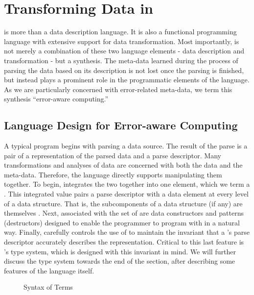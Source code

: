 \section{Transforming Data in \datatype{}}
\label{sec:data-transformation}

\datatype{} is more than a data description language. It is also a
functional programming language with extensive support for data
transformation. Most importantly, \datatype{} is not merely a
combination of these two language elements - data description and
transformation - but a synthesis.  The meta-data learned during the
process of parsing the data based on its description is not lost once
the parsing is finished, but instead plays a prominent role in the
programmatic elements of the language. As we are particularly
concerned with error-related meta-data, we term this synthesis
``error-aware computing.''

\subsection{Language Design for Error-aware Computing}

A typical \datatype{} program begins with parsing a data source. The
result of the parse is a pair of a representation of the parsed data
and a parse descriptor. Many transformations and analyses of data are
concerned with both the data and the meta-data. Therefore, the
language directly supports manipulating them together. To begin,
\datatype{} integrates the two together into one element, which we
term a \pvalue{}. This integrated value pairs a parse descriptor with
a data element at every level of a data structure. That is, the
subcomponents of a data structure (if any) are themselves \pvalue{}.
Next, associated with the set of \pvalue{} are data constructors and
patterns (destructors) designed to enable the programmer to program
with \pvalue{} in a natural way.  Finally, \datatype{} carefully
controls the use of \pvalue{} to maintain the invariant that a
\pvalue{}'s parse descriptor accurately describes the representation.
Critical to this last feature is \datatype{}'s type system, which is
designed with this invariant in mind. We will further discuss the type
system towards the end of the section, after describing some features
of the language itself.

\begin{figure}
  \centering
  
  \caption{Syntax of Terms}
  \label{fig:syntax-terms}
\end{figure}

